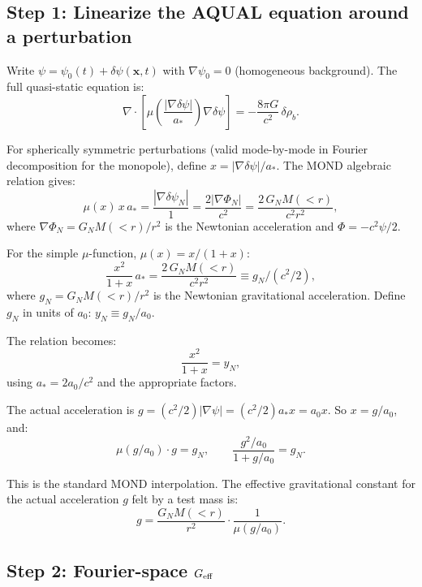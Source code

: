 \documentclass[11pt]{article}
\newcommand{\dpsi}{\delta\psi}
\newcommand{\Geff}{G_{\rm eff}}
\newcommand{\astar}{a_*}
\begin{document}
\subsection{Step 1: Linearize the AQUAL equation around a perturbation}

Write $\psi = \psi_0(t) + \dpsi(\mathbf{x}, t)$ with $\nabla\psi_0 = 0$
(homogeneous background). The full quasi-static equation is:
\begin{equation}
\nabla\cdot\left[\mu\!\left(\frac{|\nabla\dpsi|}{\astar}\right)
\nabla\dpsi\right] = -\frac{8\pi G}{c^2}\,\delta\rho_b.
\label{eq:AQUAL-pert}
\end{equation}

For spherically symmetric perturbations (valid mode-by-mode in Fourier
decomposition for the monopole), define $x = |\nabla\dpsi|/\astar$.
The MOND algebraic relation gives:
\begin{equation}
\mu(x)\,x\,\astar = \frac{|\nabla\dpsi_N|}{1} = \frac{2|\nabla\Phi_N|}{c^2}
= \frac{2\,G_N M(<r)}{c^2 r^2},
\end{equation}
where $\nabla\Phi_N = G_N M(<r)/r^2$ is the Newtonian acceleration
and $\Phi = -c^2\psi/2$.

For the simple $\mu$-function, $\mu(x) = x/(1+x)$:
\begin{equation}
\frac{x^2}{1+x}\,\astar = \frac{2\,G_N M(<r)}{c^2 r^2}
\equiv g_N / (c^2/2),
\end{equation}
where $g_N = G_N M(<r)/r^2$ is the Newtonian gravitational
acceleration. Define $g_N$ in units of $a_0$: $y_N \equiv g_N/a_0$.

The relation becomes:
\begin{equation}
\frac{x^2}{1+x} = y_N,
\end{equation}
using $\astar = 2a_0/c^2$ and the appropriate factors.

The actual acceleration is $g = (c^2/2)|\nabla\psi| = (c^2/2)\astar x
= a_0 x$. So $x = g/a_0$, and:
\begin{equation}
\mu(g/a_0)\cdot g = g_N, \qquad
\frac{g^2/a_0}{1+g/a_0} = g_N.
\label{eq:MOND-relation}
\end{equation}

This is the standard MOND interpolation. The effective gravitational
constant for the actual acceleration $g$ felt by a test mass is:
\begin{equation}
g = \frac{G_N M(<r)}{r^2} \cdot \frac{1}{\mu(g/a_0)}.
\end{equation}

\subsection{Step 2: Fourier-space $\Geff$}
\end{document}
